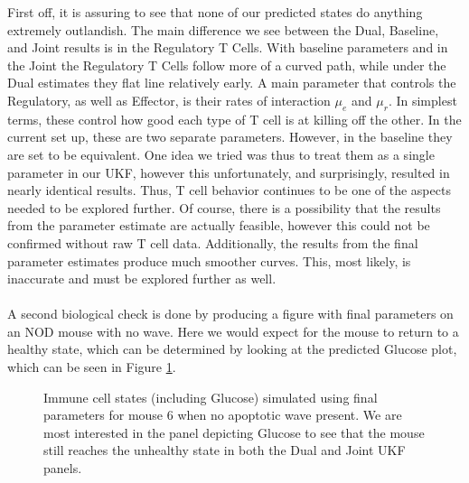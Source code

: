 First off, it is assuring to see that none of our predicted states do anything extremely outlandish. The main difference we see between the Dual, Baseline, and Joint results is in the Regulatory T Cells. With baseline parameters and in the Joint the Regulatory T Cells follow more of a curved path, while under the Dual estimates they flat line relatively early. A main parameter that controls the Regulatory, as well as Effector, is their rates of interaction $\mu_e$ and $\mu_r$. In simplest terms, these control how good each type of T cell is at killing off the other. In the current set up, these are two separate parameters. However, in the baseline they are set to be equivalent. One idea we tried was thus to treat them as a single parameter in our UKF, however this unfortunately, and surprisingly, resulted in nearly identical results. Thus, T cell behavior continues to be one of the aspects needed to be explored further. Of course, there is a possibility that the results from the parameter estimate are actually feasible, however this could not be confirmed without raw T cell data. Additionally, the results from the final parameter estimates produce much smoother curves. This, most likely, is inaccurate and must be explored further as well.\\
\\
A second biological check is done by producing a figure with final parameters on an NOD mouse with no wave. Here we would expect for the mouse to return to a healthy state, which can be determined by looking at the predicted Glucose plot, which can be seen in Figure \ref{fig:T1D_StatesNoWave}.\\


\begin{figure}[H]
    \centering
    \hfill
    \caption{Immune cell states (including Glucose) simulated using final parameters for mouse 6 when no apoptotic wave present. We are most interested in the panel depicting Glucose to see that the mouse still reaches the unhealthy state in both the Dual and Joint UKF panels.}
    \label{fig:T1D_StatesNoWave}
\end{figure}



